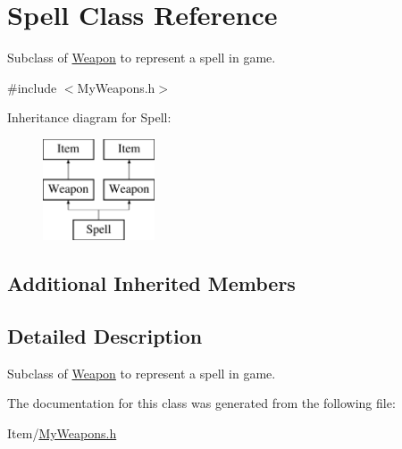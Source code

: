 \hypertarget{classSpell}{\section{Spell Class Reference}
\label{classSpell}
}


Subclass of \hyperlink{classWeapon}{Weapon} to represent a spell in game.  




{\ttfamily \#include $<$My\-Weapons.\-h$>$}

Inheritance diagram for Spell\-:\begin{figure}[H]
\begin{center}
\leavevmode
\includegraphics[height=3.000000cm]{classSpell}
\end{center}
\end{figure}
\subsection*{Additional Inherited Members}


\subsection{Detailed Description}
Subclass of \hyperlink{classWeapon}{Weapon} to represent a spell in game. 

The documentation for this class was generated from the following file\-:\begin{DoxyCompactItemize}
\item 
Item/\hyperlink{MyWeapons_8h}{My\-Weapons.\-h}\end{DoxyCompactItemize}
